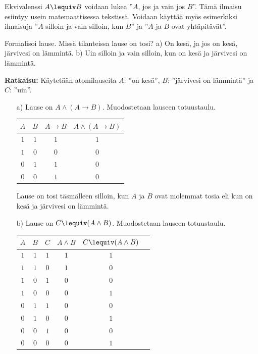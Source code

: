 \bigskip

Ekvivalenssi $A\lequiv B$ voidaan lukea ''$A$, jos ja vain jos $B$''. Tämä ilmaisu esiintyy usein matemaattisessa tekstissä. Voidaan käyttää myös esimerkiksi ilmaisuja ''$A$ silloin ja vain silloin, kun $B$'' ja ''$A$ ja $B$ ovat yhtäpitävät''.


\begin{esimerkki}
Formalisoi lause. Missä tilanteissa lause on tosi? a) On kesä, ja jos on kesä, järvivesi on lämmintä. b) Uin silloin ja vain silloin, kun on kesä ja järvivesi on lämmintä. 

{\bf Ratkaisu:}
Käytetään atomilauseita $A$: ''on kesä'',
$B$: ''järvivesi on lämmintä'' ja $C$: ''uin''.
\begin{itemize}
\item[a)] Lause on $A \land (A \to B)$. Muodostetaan
lauseen totuustaulu.

\bigskip

\begin{center}
\begin{tabular}{|c|c|c|c|}\hline
$A$ & $B$ & $A \to B$ & $A \land (A \to B)$\\ \hline
$1$ & $1$ & $1$ & $1$\\ %
$1$ & $0$ & $0$ & $0$\\
$0$ & $1$ & $1$ & $0$\\
$0$ & $0$ & $1$ & $0$\\ \hline
\end{tabular}
\end{center}

\bigskip

Lause on tosi täsmälleen silloin, kun $A$ ja $B$ ovat
molemmat tosia eli kun on kesä ja järvivesi on lämmintä.
\item[b)] Lause on $C \lequiv (A \land B)$. Muodostetaan
lauseen totuustaulu.

\bigskip

\begin{center}
\begin{tabular}{|c|c|c|c|c|c|}\hline
$A$ & $B$ & $C$ & $A \land B$ & $C \lequiv (A \land B)$\\
\hline
$1$ & $1$ & $1$ & $1$ & $1$\\ %
$1$ & $1$ & $0$ & $1$ & $0$\\
$1$ & $0$ & $1$ & $0$ & $0$\\ %
$1$ & $0$ & $0$ & $0$ & $1$\\
$0$ & $1$ & $1$ & $0$ & $0$\\
$0$ & $1$ & $0$ & $0$ & $1$\\ %
$0$ & $0$ & $1$ & $0$ & $0$\\
$0$ & $0$ & $0$ & $0$ & $1$\\ \hline
\end{tabular}
\end{center}


\end{itemize}
\end{esimerkki}
